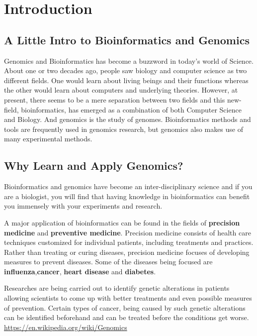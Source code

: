 \chapter{Introduction}\label{ch:ch1}

\section{A Little Intro to Bioinformatics and Genomics}
Genomics and Bioinformatics has become a buzzword in today's world of Science. About one or two decades ago, people saw biology and computer science as two different fields. One would learn about living beings and their functions whereas the other would learn about computers and underlying theories. However, at present, there seems to be a mere separation between two fields and this new-field, bioinformatics, has emerged as a combination of both Computer Science and Biology. And genomics is the study of genomes. Bioinformatics methods and tools are frequently used in genomics research, but genomics also makes use of many experimental methods. 

\section{Why Learn and Apply Genomics?} 
Bioinformatics and genomics have become an inter-disciplinary science and if you are a biologist, you will find that having knowledge in bioinformatics can benefit you immensely with your experiments and research.

A major application of bioinformatics can be found in the fields of \textbf{precision medicine}  and \textbf{preventive medicine}. Precision medicine consists of health care techniques customized for individual patients, including treatments and practices. Rather than treating or curing diseases, precision medicine focuses of developing measures to prevent diseases. Some of the diseases being focused are \textbf{influenza},\textbf{cancer}, \textbf{heart disease} and \textbf{diabetes}.


Researches are being carried out to identify genetic alterations in patients allowing scientists to come up with better treatments and even possible measures of prevention. Certain types of cancer, being caused by such genetic alterations can be identified beforehand and can be treated before the conditions get worse. \url{https://en.wikipedia.org/wiki/Genomics}


